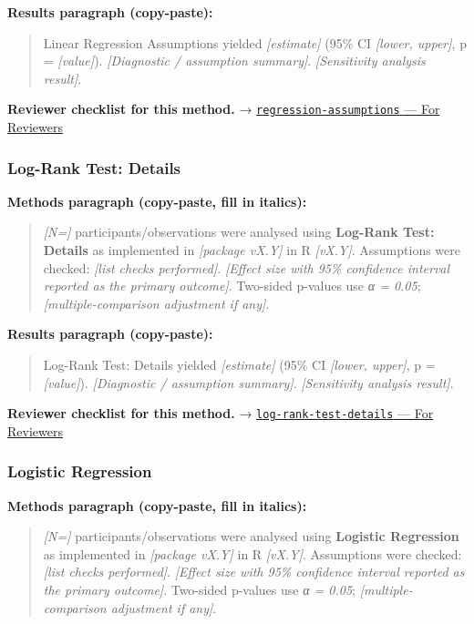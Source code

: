 \documentclass[
]{article}
\begin{document}
\textbf{Results paragraph (copy-paste):}

\begin{quote}
Linear Regression Assumptions yielded \emph{{[}estimate{]}} (95\% CI
\emph{{[}lower, upper{]}}, p = \emph{{[}value{]}}). \emph{{[}Diagnostic
/ assumption summary{]}}. \emph{{[}Sensitivity analysis result{]}}.
\end{quote}

\textbf{Reviewer checklist for this method.} →
\href{../chapters/07-regression/regression-assumptions.Rmd\#for-reviewers}{\texttt{regression-assumptions}
--- For Reviewers}

\subsubsection{Log-Rank Test: Details}\label{log-rank-test-details}

\textbf{Methods paragraph (copy-paste, fill in italics):}

\begin{quote}
\emph{{[}N={]}} participants/observations were analysed using
\textbf{Log-Rank Test: Details} as implemented in \emph{{[}package
vX.Y{]}} in R \emph{{[}vX.Y{]}}. Assumptions were checked: \emph{{[}list
checks performed{]}}. \emph{{[}Effect size with 95\% confidence interval
reported as the primary outcome{]}}. Two-sided p-values use \emph{α =
0.05}; \emph{{[}multiple-comparison adjustment if any{]}}.
\end{quote}

\textbf{Results paragraph (copy-paste):}

\begin{quote}
Log-Rank Test: Details yielded \emph{{[}estimate{]}} (95\% CI
\emph{{[}lower, upper{]}}, p = \emph{{[}value{]}}). \emph{{[}Diagnostic
/ assumption summary{]}}. \emph{{[}Sensitivity analysis result{]}}.
\end{quote}

\textbf{Reviewer checklist for this method.} →
\href{../chapters/11-survival/log-rank-test-details.Rmd\#for-reviewers}{\texttt{log-rank-test-details}
--- For Reviewers}

\subsubsection{Logistic Regression}\label{logistic-regression}

\textbf{Methods paragraph (copy-paste, fill in italics):}

\begin{quote}
\emph{{[}N={]}} participants/observations were analysed using
\textbf{Logistic Regression} as implemented in \emph{{[}package vX.Y{]}}
in R \emph{{[}vX.Y{]}}. Assumptions were checked: \emph{{[}list checks
performed{]}}. \emph{{[}Effect size with 95\% confidence interval
reported as the primary outcome{]}}. Two-sided p-values use \emph{α =
0.05}; \emph{{[}multiple-comparison adjustment if any{]}}.
\end{quote}
\end{document}

